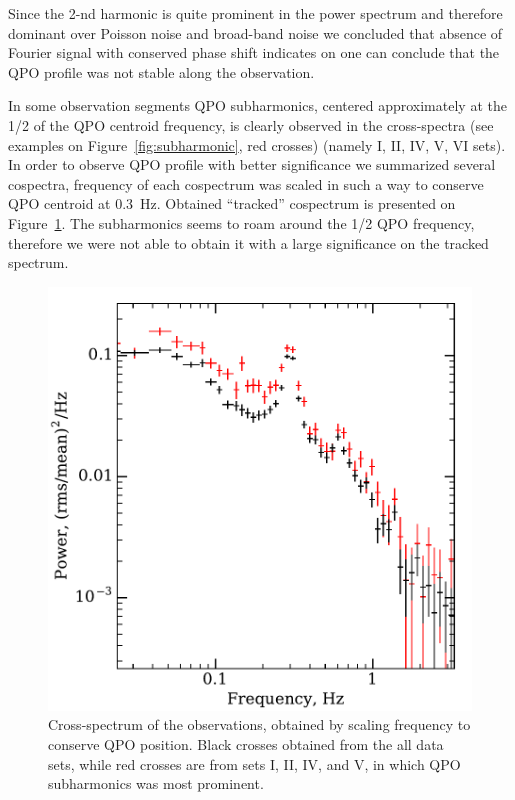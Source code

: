\documentclass[a4paper,fleqn,usenatbib]{mnras}
\begin{document}
Since the 2-nd harmonic is quite prominent in the power spectrum and therefore dominant over Poisson noise and broad-band noise we concluded that absence of Fourier signal with conserved phase shift indicates on one can conclude that the QPO profile was not stable along the observation. 

In some observation segments QPO subharmonics, centered approximately at the 1/2 of the QPO centroid frequency, is clearly observed in the cross-spectra (see examples on Figure~\ref{fig:subharmonic}, red crosses) (namely I, II, IV, V, VI sets).
In order to observe QPO profile with better significance we summarized several cospectra, frequency of each cospectrum was scaled in such a way to conserve QPO centroid at 0.3~Hz.
Obtained ``tracked'' cospectrum is presented on Figure~\ref{fig:cospec_tracked}.
The subharmonics seems to roam around the 1/2 QPO frequency, therefore we were not able to obtain it with a large significance on the tracked spectrum.


\begin{figure}
        \includegraphics[width=\columnwidth]{folded_cospectr2.pdf}
        \caption{Cross-spectrum of the observations, obtained by scaling frequency to conserve QPO position.
        Black crosses obtained from the all data sets, while red crosses are from sets I, II, IV, and V, in which QPO subharmonics was most prominent.}
        \label{fig:cospec_tracked}
\end{figure}
\end{document}

